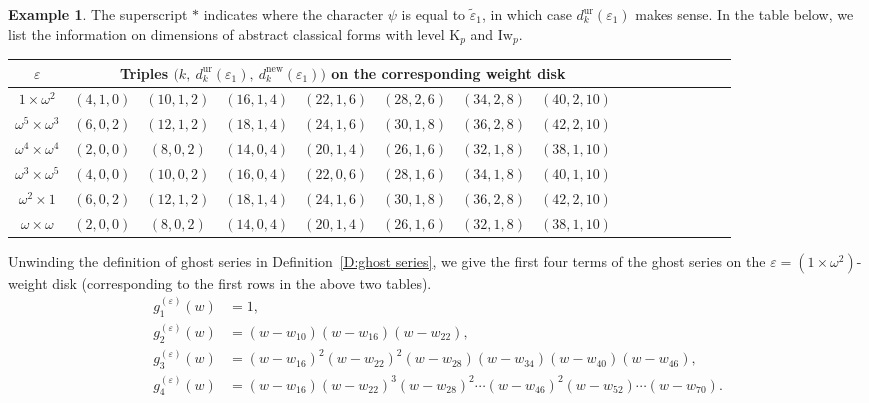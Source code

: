 \documentclass[12pt]{amsart}
\theoremstyle{definition}
\newtheorem{example}[subsection]{Example}
\numberwithin{equation}{subsection}
\def\rmK{\mathrm{K}}
\newcommand{\Iw}{\mathrm{Iw}}
\newcommand{\unr}{\mathrm{ur}}
\begin{document}
\begin{example}
The superscript $*$ indicates where the character $\psi$ is equal to $\tilde \varepsilon_1$, in which case $d_{k}^\unr(\varepsilon_1)$ makes sense.
In the table below, we list the information on dimensions of abstract classical forms with level $\rmK_p$ and $\Iw_p$.
\begin{center}\renewcommand{\arraystretch}{1.2}
\begin{tabular}{|c|c|c|c|c|c|c|c|c|c|c|c|c|c|c|c|}
\hline
$\varepsilon$ & \multicolumn{7}{|c|}{Triples $\big(k, \ d_{k}^\unr(\varepsilon_1),\ d_{k}^{\textrm{new}}(\varepsilon_1)\big)$ on the corresponding weight disk}
\\
\hline
$1 \times \omega^2$ & 
 $(4, 1, 0)$  & $(10, 1, 2) $ & $(16, 1, 4)$ & $(22, 1, 6)$ & $(28, 2, 6)$ & $(34, 2,8)$ & $(40, 2, 10)$ \\
 \hline
 $\omega^5 \times \omega^3$ &
 $(6, 0, 2)$ & $(12, 1, 2)$ & $(18, 1, 4)$ & $(24, 1, 6)$ & $(30, 1, 8)$ & $(36, 2, 8)$ & $(42, 2, 10)$
\\ \hline
 $\omega^4 \times \omega^4$ &
  $(2,0,0)$  & $(8,0, 2)$ & $(14, 0, 4)$ & $(20, 1, 4)$ & $(26, 1, 6)$ & $(32, 1, 8)$ & $(38, 1, 10)$
\\ \hline
 $\omega^3 \times \omega^5$ &
$(4, 0, 0)$  & $(10, 0, 2) $ & $(16, 0, 4)$ & $(22, 0, 6)$ & $(28, 1, 6)$& $(34, 1,8)$ & $(40, 1, 10)$
\\ \hline
 $\omega^2 \times 1$ &
$(6, 0, 2)$ & $(12, 1, 2)$ & $(18, 1, 4)$ & $(24, 1, 6)$ & $(30, 1, 8)$& $(36, 2, 8)$ & $(42, 2, 10)$
\\ \hline
 $\omega \times \omega$ &
$(2,0,0)$  & $(8,0, 2)$ & $(14, 0, 4)$ & $(20, 1, 4)$ & $(26, 1, 6)$ & $(32, 1, 8)$ & $(38, 1, 10)$
\\ \hline
\end{tabular}
\end{center}

Unwinding the definition of ghost series in Definition~\ref{D:ghost series}, we give  the first four terms of the ghost series on the $\varepsilon = (1 \times \omega^2)$-weight disk (corresponding to the first rows in the above two tables).
\begin{align*}
g_1^{(\varepsilon)}(w) &=1,
\\
g_2^{(\varepsilon)}(w) &=(w-w_{10})(w-w_{16})(w-w_{22}),
\\
g_3^{(\varepsilon)}(w) &=(w-w_{16})^2(w-w_{22})^2(w-w_{28})(w-w_{34})(w-w_{40})(w-w_{46}),
\\
g_4^{(\varepsilon)}(w) & = (w-w_{16})(w-w_{22})^3(w-w_{28})^2 \cdots (w-w_{46})^2(w-w_{52}) \cdots (w-w_{70}).
\end{align*}


\end{example}
\end{document}
